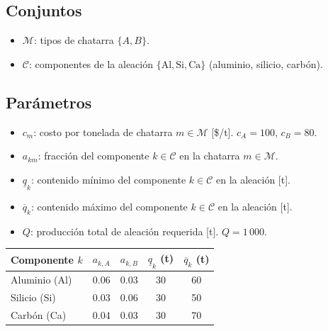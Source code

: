 \documentclass[12pt,a4paper]{article}
\begin{document}
\subsection{Conjuntos}

\begin{conjbox}
\begin{itemize}[leftmargin=1.5em]
  \item $\mathcal{M}$: tipos de chatarra $\{A, B\}$.
  \item $\mathcal{C}$: componentes de la aleación $\{\text{Al}, \text{Si}, \text{Ca}\}$ (aluminio, silicio, carbón).
\end{itemize}
\end{conjbox}

\subsection{Parámetros}

\begin{parambox}
\begin{itemize}[leftmargin=1.5em]
  \item $c_m$: costo por tonelada de chatarra $m \in \mathcal{M}$ [\$/t]. $c_A=100$, $c_B=80$.
  \item $a_{km}$: fracción del componente $k \in \mathcal{C}$ en la chatarra $m \in \mathcal{M}$.
  \item $\underline{q}_k$: contenido mínimo del componente $k \in \mathcal{C}$ en la aleación [t].
  \item $\overline{q}_k$: contenido máximo del componente $k \in \mathcal{C}$ en la aleación [t].
  \item $Q$: producción total de aleación requerida [t]. $Q = 1\,000$.
\end{itemize}

\medskip
\begin{center}
\renewcommand{\arraystretch}{1.3}
\begin{tabular}{@{}lcccc@{}}
\toprule
\textbf{Componente $k$} & $a_{k,A}$ & $a_{k,B}$ & $\underline{q}_k$ (t) & $\overline{q}_k$ (t)\\
\midrule
Aluminio (Al) & 0.06 & 0.03 & 30 & 60\\
Silicio  (Si) & 0.03 & 0.06 & 30 & 50\\
Carbón   (Ca) & 0.04 & 0.03 & 30 & 70\\
\bottomrule
\end{tabular}
\end{center}
\end{parambox}
\end{document}
